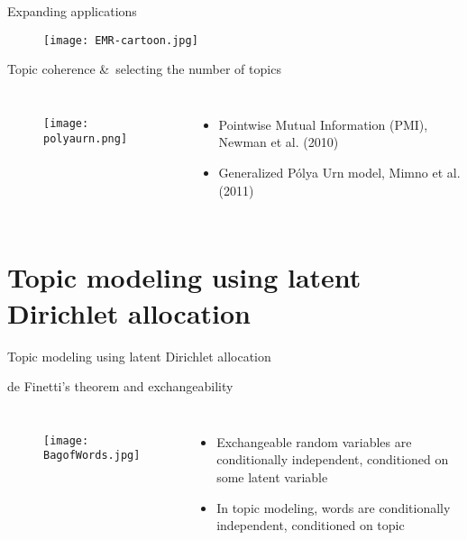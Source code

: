 \documentclass{beamer}
\begin{document}
\begin{frame}{Expanding applications}
\begin{figure}[htb!]
\texttt{[image: EMR-cartoon.jpg]}
\end{figure}
\end{frame}

\begin{frame}{Topic coherence \&\ selecting the number of topics}
\begin{columns}
\begin{figure}[htb!]
\texttt{[image: polyaurn.png]}
\end{figure}
\begin{itemize}
\item Pointwise Mutual Information (PMI), Newman et al. (2010)
\item Generalized P\'{o}lya Urn model, Mimno et al. (2011) 
\end{itemize}
\end{columns}
\end{frame}

\section{Topic modeling using latent Dirichlet allocation}
\begin{frame}{Topic modeling using latent Dirichlet allocation}
\end{frame}

\begin{frame}{de Finetti's theorem and exchangeability}
\begin{columns}
\begin{figure}[htb!]
\texttt{[image: BagofWords.jpg]}
\end{figure}
\begin{itemize}
\item Exchangeable random variables are conditionally independent,
conditioned on some latent variable
\item In topic modeling, words are conditionally independent,
conditioned on topic
\end{itemize}
\end{columns}
\end{frame}
\end{document}
